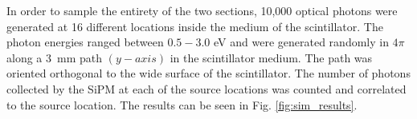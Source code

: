 
In order to sample the entirety of the two sections, 10,000 optical photons were generated at 16 different locations inside the medium of the scintillator. 
The photon energies ranged between $0.5 - 3.0$ eV \cite{krane_ch7} and were generated randomly in $4\pi$ along a 3~mm path $(y-axis)$ in the scintillator medium.  The path was oriented orthogonal to the wide surface of the scintillator.  
The number of photons collected by the SiPM at each of the source locations was counted and correlated to the source location.  The results can be seen in Fig. \ref{fig:sim_results}.
